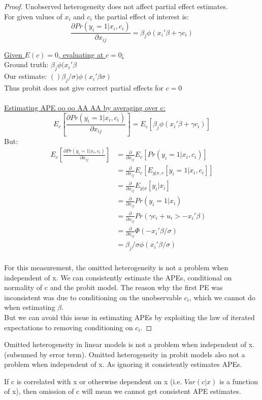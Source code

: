 \documentclass[DIV=14,titlepage=false]{scrreprt}
\begin{document}
\begin{proof}
    Unobserved heterogeneity does not affect partial effect estimates.\\
    For given values of \(x_i\) and \(c_i\) the partial effect of interest is:
    \[\frac{\partial Pr(y_i=1|x_i,c_i)}{\partial x_{ij}}=\beta_j\phi(x_i'\beta+\gamma c_i)\]

\underline{Given \(E(c)=0\), evaluating at \(c=0\):}\\
Ground truth: \(\beta_j\phi (x_i'\beta\)\\
Our estimate: \(()\beta_j/\sigma)\phi(x_i'\beta\sigma)\)\\
Thus probit does not give correct partial effects for \(c=0\)\\ \\

\underline{Estimating APE oo oo AA AA by averaging over c:}\\
\[E_c[\frac{\partial Pr(y_i=1|x_i,c_i)}{\partial x_{ij}}]=E_c[\beta_j\phi(x_i'\beta+\gamma c_i)]\]
But:
\begin{align*}
    E_c[\frac{\partial Pr(y_i=1|x_i,c_i)}{\partial x_{ij}}] &= \frac{\partial}{\partial x_{ij}}E_c[Pr(y_i=1|x_i,c_i)]\\
    &= \frac{\partial}{\partial x_{ij}}E_c[E_{y|x,c}[y_i=1|x_i,c_i]]\\
    &= \frac{\partial}{\partial x_{ij}}E_{y|x}[y_i|x_i]\\
    &= \frac{\partial}{\partial x_{ij}}Pr(y_i=1|x_i)\\
    &= \frac{\partial}{\partial x_{ij}}Pr(\gamma c_i + u_i>-x_i'\beta)\\
    &= \frac{\partial}{\partial x_{ij}}\Phi(-x_i'\beta/\sigma)\\
    &= \beta_j/\sigma\phi(x_i'\beta/\sigma)\\
\end{align*}

For this measurement, the omitted heterogeneity is not a problem when independent of x. We can consistently estimate the APEs, conditional on normality of c and the probit model.
The reason why the first PE was inconsistent was due to conditioning on the unobservable \(c_i\), which we cannot do when estimating \(\beta\).\\
But we can avoid this issue in estimating APEs by exploiting the law of iterated expectations to removing conditioning on \(c_i\).
\end{proof}

Omitted heterogeneity in linear models is not a problem when independent of x. (subsumed by error term).
Omitted heterogeneity in probit models also not a problem when independent of x. As ignoring it consistently estimates APEs.

\begin{note}
    If c is correlated with x or otherwise dependent on x (i.e. \(Var(c|x)\) is a function of x), then omission of c will mean we cannot get consistent APE estimates.
\end{note}
\end{document}
